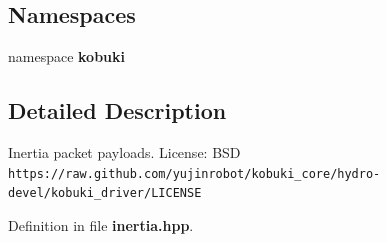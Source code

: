 \subsection*{\-Namespaces}
\begin{DoxyCompactItemize}
\item 
namespace {\bf kobuki}
\end{DoxyCompactItemize}


\subsection{\-Detailed \-Description}
\-Inertia packet payloads. \-License\-: \-B\-S\-D {\tt https\-://raw.\-github.\-com/yujinrobot/kobuki\-\_\-core/hydro-\/devel/kobuki\-\_\-driver/\-L\-I\-C\-E\-N\-S\-E} 

\-Definition in file {\bf inertia.\-hpp}.

